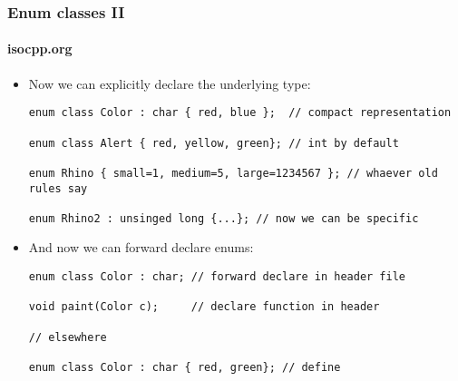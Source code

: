 \begin{frame}[fragile]
\frametitle{Enum classes II}
\framesubtitle{isocpp.org}
\begin{itemize}
\item Now we can explicitly declare the underlying type:
{\scriptsize
\begin{verbatim}
enum class Color : char { red, blue };  // compact representation

enum class Alert { red, yellow, green}; // int by default

enum Rhino { small=1, medium=5, large=1234567 }; // whaever old rules say

enum Rhino2 : unsinged long {...}; // now we can be specific
\end{verbatim}
}
\pause{}

\vskip 6pt

\item And now we can forward declare enums:

{\scriptsize
\begin{verbatim}
enum class Color : char; // forward declare in header file

void paint(Color c);     // declare function in header

// elsewhere

enum class Color : char { red, green}; // define
\end{verbatim}
}

\end{itemize}


\end{frame}
